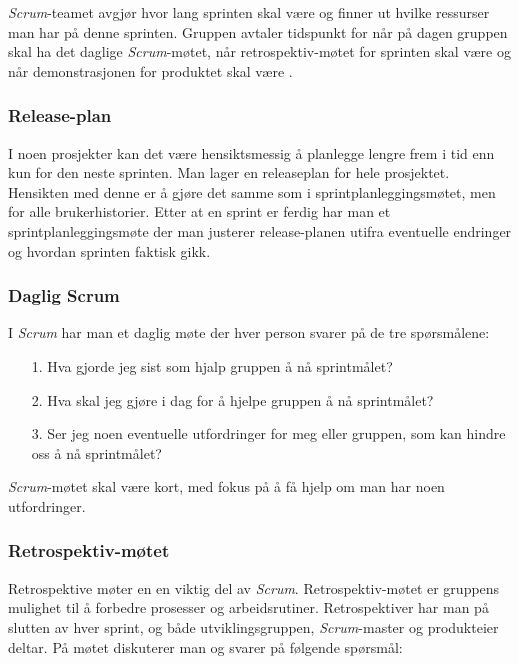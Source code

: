 \documentclass[12pt,a4paper,norsk]{article}
\begin{document}
    \textit{Scrum}-teamet avgjør hvor lang sprinten skal være og finner ut hvilke ressurser man har på denne sprinten. Gruppen avtaler tidspunkt for når på dagen gruppen skal ha det daglige \textit{Scrum}-møtet, når retrospektiv-møtet for sprinten skal være og når demonstrasjonen for produktet skal være \cite[side 16]{kniberg}.

  \subsubsection{Release-plan}
  I noen prosjekter kan det være hensiktsmessig å planlegge lengre frem i tid enn kun for den neste sprinten. Man lager en releaseplan for hele prosjektet. Hensikten med denne er å gjøre det samme som i sprintplanleggingsmøtet, men for alle brukerhistorier. Etter at en sprint er ferdig har man et sprintplanleggingsmøte der man justerer release-planen utifra eventuelle endringer og hvordan sprinten faktisk gikk. \cite[side 95 - 101]{kniberg}

  \subsubsection{Daglig Scrum}
  I \textit{Scrum} har man et daglig møte der hver person svarer på de tre spørsmålene:

  \begin{itemize}
        \item[1.] Hva gjorde jeg sist som hjalp gruppen å nå sprintmålet?
        \item[2.] Hva skal jeg gjøre i dag for å hjelpe gruppen å nå sprintmålet?
        \item[3.] Ser jeg noen eventuelle utfordringer for meg eller gruppen, som kan hindre oss å nå sprintmålet?
    \end{itemize}

    \textit{Scrum}-møtet skal være kort, med fokus på å få hjelp om man har noen utfordringer.

  \subsubsection{Retrospektiv-møtet}
      Retrospektive møter en en viktig del av \textit{Scrum}. Retrospektiv-møtet er gruppens mulighet til å forbedre prosesser og arbeidsrutiner. Retrospektiver har man på slutten av hver sprint, og både utviklingsgruppen, \textit{Scrum}-master og produkteier deltar. På møtet diskuterer man og svarer på følgende spørsmål:
\end{document}
